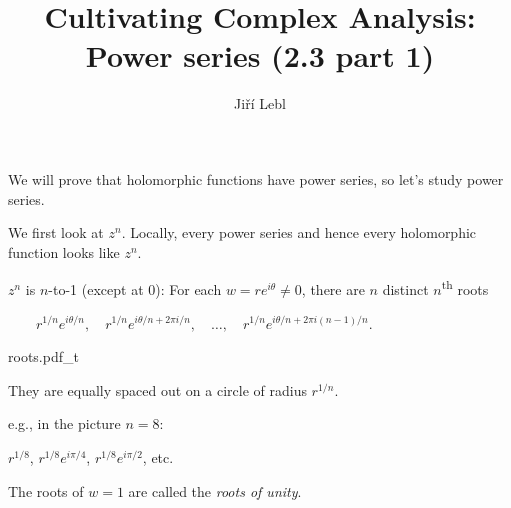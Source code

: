 \documentclass[10pt,aspectratio=169]{beamer}
\author{Ji\v{r}\'i Lebl}
\institute[OSU]{%
Departemento pri Matematiko de Oklahoma {\^S}tata Universitato}
\title{Cultivating Complex Analysis:\\%
Power series (2.3 part 1)}
\date{}
\begin{document}
\begin{frame}
\titlepage
\end{frame}

\begin{frame}
We will prove that holomorphic functions have power series, so let's study
power series.

\medskip
\pause

We first look at $z^n$. \pause
Locally, every power series and hence every holomorphic function looks like
$z^n$.

\medskip
\pause

$z^n$ is $n$-to-1 (except at $0$): 
\pause
For each $w = r e^{i\theta} \not=0$, there are $n$ distinct
$n$\textsuperscript{th} roots

\medskip
$\displaystyle
\qquad
r^{1/n} e^{i\theta/n}
, \quad
r^{1/n} e^{i\theta/n + 2\pi i /n}
, \quad \ldots, \quad
r^{1/n} e^{i\theta/n + 2\pi i (n-1)/n} .
$
\medskip
\pause

\vspace*{-0.2in}
\hspace*{3.5in}%
{roots.pdf_t}


\vspace*{-0.9in}
They are equally
spaced out on a circle of radius $r^{1/n}$.

\medskip

e.g., in the picture $n=8$:

\medskip

$r^{1/8}$, $r^{1/8} e^{i \pi / 4}$,  $r^{1/8} e^{i \pi / 2}$,
etc.

\medskip
\pause


The roots of $w=1$ are
called the \emph{roots of unity}.
\end{frame}
\end{document}

